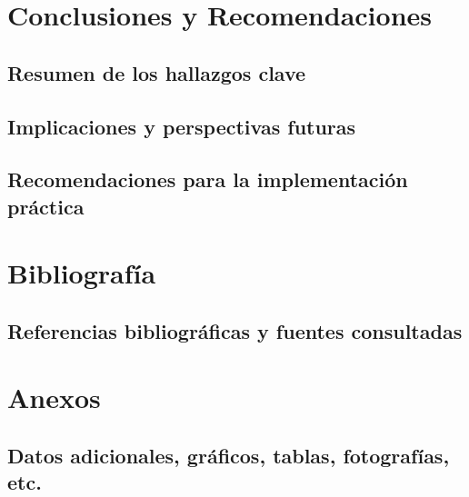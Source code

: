 \documentclass[12pt,a4paper,oneside]{book}
\begin{document}
\chapter{Conclusiones y Recomendaciones}

\section{Resumen de los hallazgos clave}

\section{Implicaciones y perspectivas futuras}

\section{Recomendaciones para la implementación práctica}

\chapter{Bibliografía}

\section{Referencias bibliográficas y fuentes consultadas}

\chapter{Anexos}

\section{Datos adicionales, gráficos, tablas, fotografías, etc.}




\end{document}

